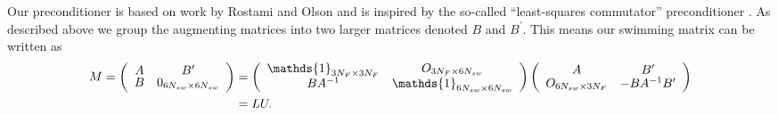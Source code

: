 Our preconditioner is based on work by Rostami and Olson \cite{Rostami2019FastBiofluids} and is inspired by the so-called “least-squares commutator” preconditioner \cite{Elman2005FiniteDynamics}. As described above we group the augmenting matrices into two larger matrices denoted $B$ and $B^\prime$. This means our swimming matrix can be written as 
\begin{equation*}
\begin{aligned}
\def\arraystretch{0.8}
    M = \left(\begin{array}{cc}
        A & B^\prime \\
        B & 0_{6N_{sw}\times6N_{sw}} 
    \end{array}\right) &= 
    \left(\begin{array}{cc}
        \mathds{1}_{3N_F \times 3N_F} & O_{3N_F\times6N_{sw}} \\
        BA^{-1} & \mathds{1}_{6N_{sw} \times 6N_{sw}}
    \end{array}\right)
    \left(\begin{array}{cc}
        A & B^\prime \\
        O_{6N_{sw}\times3N_F} & -BA^{-1}B^\prime
    \end{array}\right) \\
    &= LU.
\end{aligned}
\end{equation*}

